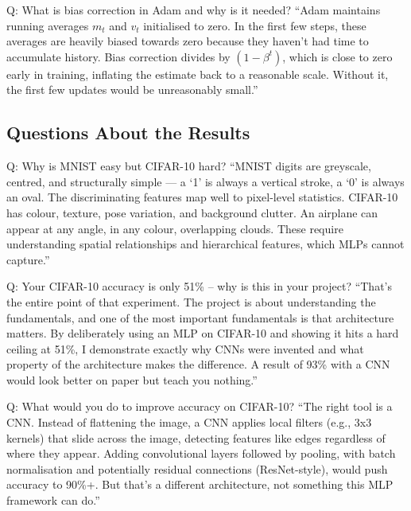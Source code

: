 \documentclass[12pt, a4paper]{article}
\begin{document}
\begin{interviewbox}{Q: What is bias correction in Adam and why is it needed?}
``Adam maintains running averages $m_t$ and $v_t$ initialised to zero. In the first few steps, these averages are heavily biased towards zero because they haven't had time to accumulate history. Bias correction divides by $(1 - \beta^t)$, which is close to zero early in training, inflating the estimate back to a reasonable scale. Without it, the first few updates would be unreasonably small.''
\end{interviewbox}

\subsection{Questions About the Results}

\begin{interviewbox}{Q: Why is MNIST easy but CIFAR-10 hard?}
``MNIST digits are greyscale, centred, and structurally simple --- a `1' is always a vertical stroke, a `0' is always an oval. The discriminating features map well to pixel-level statistics. CIFAR-10 has colour, texture, pose variation, and background clutter. An airplane can appear at any angle, in any colour, overlapping clouds. These require understanding spatial relationships and hierarchical features, which MLPs cannot capture.''
\end{interviewbox}

\begin{interviewbox}{Q: Your CIFAR-10 accuracy is only 51\% -- why is this in your project?}
``That's the entire point of that experiment. The project is about understanding the fundamentals, and one of the most important fundamentals is that architecture matters. By deliberately using an MLP on CIFAR-10 and showing it hits a hard ceiling at 51\%, I demonstrate exactly why CNNs were invented and what property of the architecture makes the difference. A result of 93\% with a CNN would look better on paper but teach you nothing.''
\end{interviewbox}

\begin{interviewbox}{Q: What would you do to improve accuracy on CIFAR-10?}
``The right tool is a CNN. Instead of flattening the image, a CNN applies local filters (e.g., 3x3 kernels) that slide across the image, detecting features like edges regardless of where they appear. Adding convolutional layers followed by pooling, with batch normalisation and potentially residual connections (ResNet-style), would push accuracy to 90\%+. But that's a different architecture, not something this MLP framework can do.''
\end{interviewbox}
\end{document}
